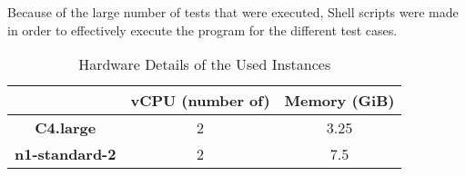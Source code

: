 Because of the large number of tests that were executed, Shell scripts were made in order to effectively execute the program for the different test cases.

	\begin{table}[H]
	\centering
		\begin{tabular}{| c | c | c |}
		\hline
		&\textbf{vCPU (number of)} & \textbf{Memory (GiB)}\\
		\hline
  		\textbf{C4.large} & 2 & 3.25 \\
  		\hline
  		\textbf{n1-standard-2} & 2 & 7.5 \\
  		\hline
		\end{tabular}
	\caption{Hardware Details of the Used Instances}
	\label{tbl:hardware}
	\end{table}
